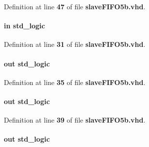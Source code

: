 Definition at line {\bf 47} of file {\bf slave\+F\+I\+F\+O5b.\+vhd}.

\paragraph[{reset\+\_\+n}]{ {\bfseries \textcolor{keywordflow}{in}\textcolor{vhdlchar}{ }} {\bfseries \textcolor{comment}{std\+\_\+logic}\textcolor{vhdlchar}{ }} \hspace{0.3cm}{\ttfamily [Port]}}\label{classslaveFIFO5b_a446ea52ed8c4a84181a47d9165ce41a5}


Definition at line {\bf 31} of file {\bf slave\+F\+I\+F\+O5b.\+vhd}.

\paragraph[{slcs}]{ {\bfseries \textcolor{keywordflow}{out}\textcolor{vhdlchar}{ }} {\bfseries \textcolor{comment}{std\+\_\+logic}\textcolor{vhdlchar}{ }} \hspace{0.3cm}{\ttfamily [Port]}}\label{classslaveFIFO5b_a38048c4ac1ac15eb81e102b8a18e4eed}


Definition at line {\bf 35} of file {\bf slave\+F\+I\+F\+O5b.\+vhd}.

\paragraph[{sloe}]{ {\bfseries \textcolor{keywordflow}{out}\textcolor{vhdlchar}{ }} {\bfseries \textcolor{comment}{std\+\_\+logic}\textcolor{vhdlchar}{ }} \hspace{0.3cm}{\ttfamily [Port]}}\label{classslaveFIFO5b_a6129c3e925f301d8c6af3e40daef44dd}


Definition at line {\bf 39} of file {\bf slave\+F\+I\+F\+O5b.\+vhd}.

\paragraph[{slrd}]{ {\bfseries \textcolor{keywordflow}{out}\textcolor{vhdlchar}{ }} {\bfseries \textcolor{comment}{std\+\_\+logic}\textcolor{vhdlchar}{ }} \hspace{0.3cm}{\ttfamily [Port]}}\label{classslaveFIFO5b_aae4bd30b1bcff190de10c4a090426c5d}


